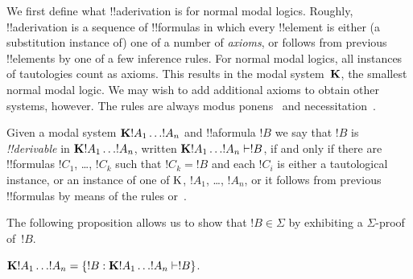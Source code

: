 \documentclass[../../../include/open-logic-section]{subfiles}
\begin{document}


We first define what !!a{derivation} is for normal modal
logics. Roughly, !!a{derivation} is a sequence of !!{formula}s in
which every !!{element} is either (a substitution instance of) one of
a number of \emph{axioms}, or follows from previous !!{element}s by
one of a few inference rules. For normal modal logics, all instances
of tautologies
count as axioms. This results in the modal system~$\mathbf{K}$, the
smallest normal modal logic. We may wish to add additional axioms to
obtain other systems, however. The rules are always modus ponens~\MP{}
and necessitation~\Nec.

\begin{defn}
  Given a modal system $\mathbf{K} !A_1 \dots !A_n$ and !!a{formula} $!B$
  we say that $!B$ is \emph{!!{derivable}} in $\mathbf{K} !A_1 \dots
  !A_n$, written $\Log{K} !A_1 \dots !A_n \Proves !B$, if and only if
  there are !!{formula}s $!C_1$, \dots, $!C_k$ such that $!C_k = !B$
  and each $!C_i$ is either a tautological instance, or an instance of
  one of $\mathrm{K}$, $!A_1$,
  \dots, $!A_n$, or it follows from previous !!{formula}s by means of
  the rules \MP{} or~\Nec.
\end{defn}

The following proposition allows us to show that $!B \in \Sigma$
by exhibiting a $\Sigma$-proof of~$!B$.

\begin{prop}
  $\Log{K} !A_1 \dots !A_n = \Setabs{!B}{\Log{K} !A_1 \dots !A_n \Proves !B}$.
\end{prop}
\end{document}
